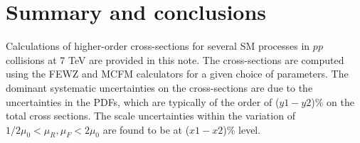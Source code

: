 \section{Summary and conclusions}
\label{sec:conclusion}
Calculations of higher-order cross-sections for several SM processes in $pp$ 
collisions at 7 TeV are provided in this note. The cross-sections are 
computed using the FEWZ and MCFM calculators for a given choice of parameters. 
The dominant systematic uncertainties on the cross-sections are due to the 
uncertainties in the PDFs, which are typically of the order of ($y1-y2$)\% on 
the total cross sections. The scale uncertainties within the variation 
of $1/2 \mu_0 < \mu_R, \mu_F < 2\mu_0$ are found to be at ($x1-x2$)\% level. 

